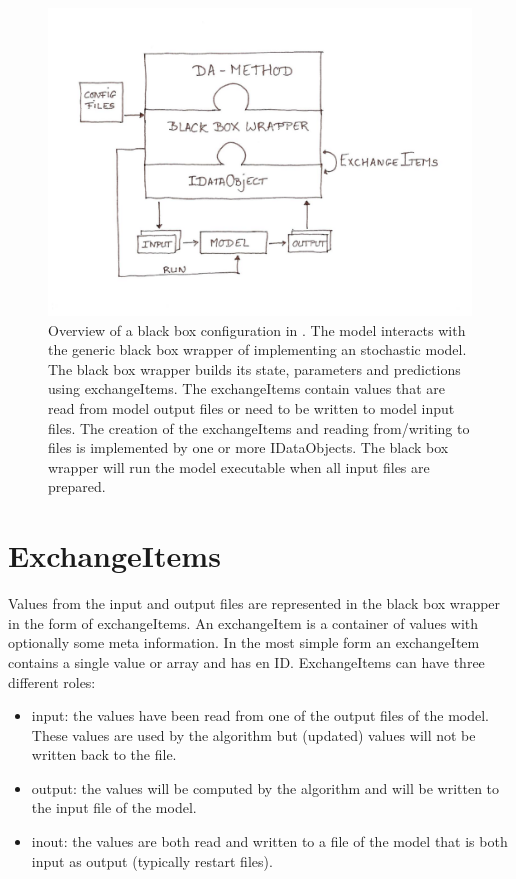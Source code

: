 \begin{figure}[h]
\begin{center}
\includegraphics[scale=0.7]{./blackbox/bb_overview.pdf}
\caption{Overview of a black box configuration in \oda. The model interacts
  with the generic black box wrapper of \oda implementing an \oda stochastic
  model. The black box wrapper builds its state, parameters and predictions
  using exchangeItems. The exchangeItems contain values that are read from
  model output files or need to be written to model input files. The creation
  of the exchangeItems and reading from/writing to files is implemented by one
  or more IDataObjects. The black box wrapper will run the model executable when
  all input files are prepared.}
\label{Fig:overview}
\end{center}
\end{figure}


\section{ExchangeItems}
Values from the input and output files are represented in the \oda black box
wrapper in the form of exchangeItems. An exchangeItem is a container of values
with optionally some meta information. In the most simple form an exchangeItem
contains a single value or array and has en ID. ExchangeItems can have three
different roles:
\begin{itemize}
\item input: the values have been read from one of the output files of the
  model. These values are used by the algorithm but (updated) values will not
  be written back to the file.
\item output: the values will be computed by the algorithm and will be written
  to the input file of the model.
\item inout: the values are both read and written to a file of the model that
  is both input as output (typically restart files).
\end{itemize}

